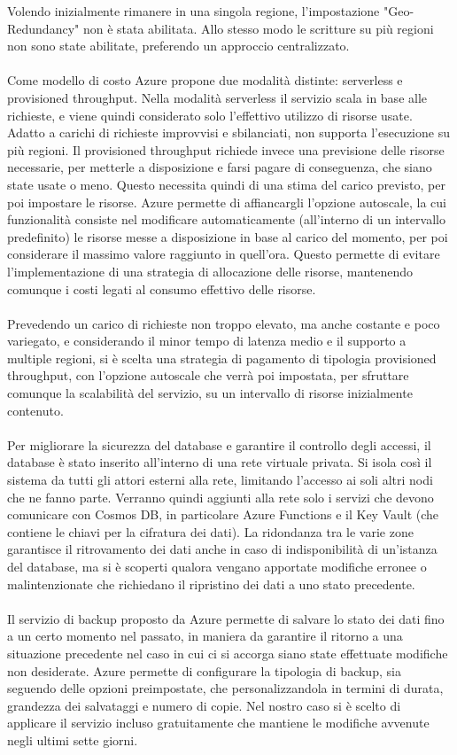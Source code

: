 Volendo inizialmente rimanere in una singola regione,
l'impostazione "Geo-Redundancy" non è stata abilitata.
Allo stesso modo le scritture su più regioni non sono state abilitate,
preferendo un approccio centralizzato.\\
\\
Come modello di costo Azure propone due modalità distinte: serverless e provisioned throughput.
Nella modalità serverless il servizio scala in base alle richieste,
e viene quindi considerato solo l'effettivo utilizzo di risorse usate.
Adatto a carichi di richieste improvvisi e sbilanciati,
non supporta l'esecuzione su più regioni.
Il provisioned throughput richiede invece una previsione delle risorse necessarie,
per metterle a disposizione e farsi pagare di conseguenza, che siano state usate o meno.
Questo necessita quindi di una stima del carico previsto,
per poi impostare le risorse.
Azure permette di affiancargli l'opzione autoscale,
la cui funzionalità consiste nel modificare automaticamente
(all'interno di un intervallo predefinito)
le risorse messe a disposizione in base al carico del momento,
per poi considerare il massimo valore raggiunto in quell'ora.
Questo permette di evitare l'implementazione di una strategia di allocazione delle risorse,
mantenendo comunque i costi legati al consumo effettivo delle risorse.\\
\\
Prevedendo un carico di richieste non troppo elevato,
ma anche costante e poco variegato,
e considerando il minor tempo di latenza medio e il supporto a multiple regioni,
si è scelta una strategia di pagamento di tipologia provisioned throughput,
con l'opzione autoscale che verrà poi impostata, 
per sfruttare comunque la scalabilità del servizio,
su un intervallo di risorse inizialmente contenuto.\\
\\
Per migliorare la sicurezza del database e garantire il controllo degli accessi,
il database è stato inserito all'interno di una rete virtuale privata.
Si isola così il sistema da tutti gli attori esterni alla rete,
limitando l'accesso ai soli altri nodi che ne fanno parte.
Verranno quindi aggiunti alla rete solo i servizi che devono comunicare con Cosmos DB,
in particolare Azure Functions e il Key Vault 
(che contiene le chiavi per la cifratura dei dati).
La ridondanza tra le varie zone garantisce il ritrovamento dei dati
anche in caso di indisponibilità di un'istanza del database,
ma si è scoperti qualora vengano apportate modifiche erronee o malintenzionate 
che richiedano il ripristino dei dati a uno stato precedente.\\
\\
Il servizio di backup proposto da Azure permette di salvare
lo stato dei dati fino a un certo momento nel passato,
in maniera da garantire il ritorno a una situazione precedente
nel caso in cui ci si accorga siano state effettuate modifiche non desiderate.
Azure permette di configurare la tipologia di backup, 
sia seguendo delle opzioni preimpostate,
che personalizzandola in termini di durata, grandezza dei salvataggi e numero di copie.
Nel nostro caso si è scelto di applicare il servizio incluso gratuitamente
che mantiene le modifiche avvenute negli ultimi sette giorni.

